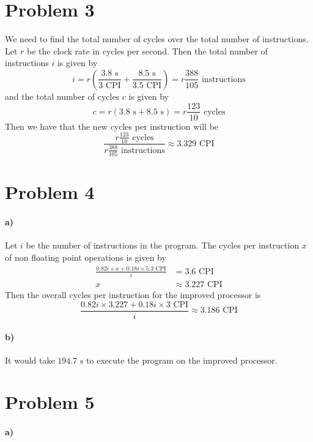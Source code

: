\documentclass[12pt]{article}
\begin{document}
\section*{Problem 3}

We need to find the total number of cycles over the total number of instructions.
Let \(r\) be the clock rate in cycles per second. Then the total number of instructions \(i\) is given by
\[i=r\left(\frac{3.8\text{ s}}{3\text{ CPI}}+\frac{8.5\text{ s}}{3.5\text{ CPI}}\right)=r\frac{388}{105}\text{ instructions}\]
and the total number of cycles \(c\) is given by
\[c=r(3.8\text{ s}+8.5\text{ s})=r\frac{123}{10}\text{ cycles}\]
Then we have that the new cycles per instruction will be
\[\frac{r\frac{123}{10}\text{ cycles}}{r\frac{388}{105}\text{ instructions}}\approx 3.329 \text{ CPI}\]

\section*{Problem 4}

\paragraph{a)}

Let \(i\) be the number of instructions in the program. The cycles per instruction \(x\) of non floating point operations is given by
\begin{align*}
        \frac{0.82i\times x+0.18i\times 5.3\text{ CPI}}{i}&=3.6\text{ CPI}\\
        x&\approx 3.227 \text{ CPI}
\end{align*}
Then the overall cycles per instruction for the improved processor is
\[\frac{0.82i\times 3.227+0.18i\times 3\text{ CPI}}{i}  \approx 3.186\text{ CPI}\]

\paragraph{b)}

It would take \(194.7\text{ s}\) to execute the program on the improved processor.

\section*{Problem 5}

\paragraph{a)}
\end{document}
